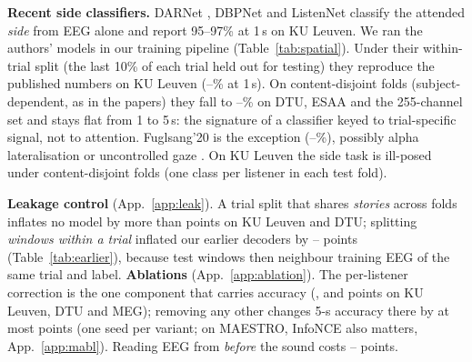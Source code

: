 \documentclass[10pt,twocolumn,letterpaper]{article}
\begin{document}
\begin{table}[!t]\centering\small
\caption{MAESTRO, 4-way matched, EEG only (chance 25\%). CoupleFlow: mean$\pm$s.d.\ over 3
seeds. \emph{Release timing}: audio anchored at the earliest playback timestamp, as in MERIT
and the benchmark, whose reported numbers are listed. \emph{Latency-corrected}: our causal
alignment. Contribution: per-trial accuracy minus the EEG-shuffle null.}\label{tab:maestro}
\resizebox{\columnwidth}{!}{}
\end{table}

\textbf{Recent side classifiers.} DARNet \citep{darnet2024}, DBPNet \citep{dbpnet2024}
and ListenNet \citep{listennet2025} classify the attended \emph{side} from EEG alone and report
95--97\% at 1\,s on KU Leuven. We ran the authors' models in our training pipeline
(Table~\ref{tab:spatial}). Under their within-trial split (the last 10\% of each trial held
out for testing) they reproduce the published numbers on KU Leuven (\spKULBmin--\spKULBmax\% at 1\,s). On content-disjoint
folds (subject-dependent, as in the papers) they fall to \spAmin--\spAmax\% on DTU, ESAA and
the 255-channel set and stays flat from 1 to 5\,s: the signature of a classifier keyed to
trial-specific signal, not to attention. Fuglsang'20 is the exception (\spFugMin--\spFugMax\%),
possibly alpha lateralisation or uncontrolled gaze \citep{rotaru2024what}. On KU Leuven the
side task is ill-posed under content-disjoint folds (one class per listener in each test
fold).

\begin{table}[!t]\centering\small
\caption{Recent side classifiers, accuracy (\%) under their within-trial split / our
content-disjoint folds (subject-dependent, as in the papers), next to CoupleFlow on the
content-disjoint folds (seed 0). $^\dagger$Ill-posed under content-disjoint folds (one class per
listener in each test fold).}\label{tab:spatial}
\resizebox{\columnwidth}{!}{}
\end{table}

\textbf{Leakage control} (App.~\ref{app:leak}). A trial split that shares \emph{stories}
across folds inflates no model by more than \leakMax{} points on KU Leuven and DTU;
splitting \emph{windows within a trial} inflated our earlier decoders by
\oldDropAllMin--\oldDropAllMax{} points (Table~\ref{tab:earlier}), because test windows then
neighbour training EEG of the same trial and label.
\textbf{Ablations} (App.~\ref{app:ablation}). The per-listener correction is the one
component that carries accuracy (\ablRankKUL, \ablRankDTU{} and \ablRankMEG{} points on KU
Leuven, DTU and MEG); removing any other changes 5-s accuracy there by at most \ablOtherMax{}
points (one seed per variant; on MAESTRO, InfoNCE also matters, App.~\ref{app:mabl}). Reading EEG from \emph{before} the sound costs \lagCtlDTU--\lagCtlKUL{} points.
\end{document}
